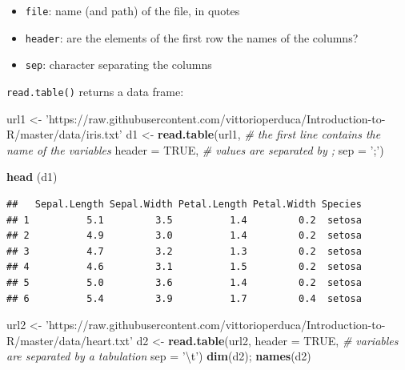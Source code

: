 \documentclass[]{book}
\newenvironment{Shaded}{\begin{snugshade}}{\end{snugshade}}
\newcommand{\CharTok}[1]{\textcolor[rgb]{0.31,0.60,0.02}{#1}}
\newcommand{\CommentTok}[1]{\textcolor[rgb]{0.56,0.35,0.01}{\textit{#1}}}
\newcommand{\DataTypeTok}[1]{\textcolor[rgb]{0.13,0.29,0.53}{#1}}
\newcommand{\KeywordTok}[1]{\textcolor[rgb]{0.13,0.29,0.53}{\textbf{#1}}}
\newcommand{\NormalTok}[1]{#1}
\newcommand{\OtherTok}[1]{\textcolor[rgb]{0.56,0.35,0.01}{#1}}
\newcommand{\StringTok}[1]{\textcolor[rgb]{0.31,0.60,0.02}{#1}}
\providecommand{\tightlist}{%
  \setlength{\itemsep}{0pt}\setlength{\parskip}{0pt}}
\begin{document}
\begin{itemize}
\tightlist
\item
  \texttt{file}: name (and path) of the file, in quotes
\item
  \texttt{header}: are the elements of the first row the names of the columns?
\item
  \texttt{sep}: character separating the columns
\end{itemize}

\texttt{read.table()} returns a data frame:

\begin{Shaded}
\begin{Highlighting}[]
\NormalTok{url1 <-}\StringTok{ 'https://raw.githubusercontent.com/vittorioperduca/Introduction-to-R/master/data/iris.txt'}
\NormalTok{d1 <-}\StringTok{ }\KeywordTok{read.table}\NormalTok{(url1,}
                 \CommentTok{# the first line contains the name of the variables}
                 \DataTypeTok{header =} \OtherTok{TRUE}\NormalTok{,}
                 \CommentTok{# values are separated by ;}
                 \DataTypeTok{sep =} \StringTok{';'}\NormalTok{) }

\KeywordTok{head}\NormalTok{ (d1)}
\end{Highlighting}
\end{Shaded}

\begin{verbatim}
##   Sepal.Length Sepal.Width Petal.Length Petal.Width Species
## 1          5.1         3.5          1.4         0.2  setosa
## 2          4.9         3.0          1.4         0.2  setosa
## 3          4.7         3.2          1.3         0.2  setosa
## 4          4.6         3.1          1.5         0.2  setosa
## 5          5.0         3.6          1.4         0.2  setosa
## 6          5.4         3.9          1.7         0.4  setosa
\end{verbatim}

\begin{Shaded}
\begin{Highlighting}[]
\NormalTok{url2 <-}\StringTok{ 'https://raw.githubusercontent.com/vittorioperduca/Introduction-to-R/master/data/heart.txt'}
\NormalTok{d2 <-}\StringTok{ }\KeywordTok{read.table}\NormalTok{(url2,}
                 \DataTypeTok{header =} \OtherTok{TRUE}\NormalTok{,}
                 \CommentTok{# variables are separated by a tabulation}
                 \DataTypeTok{sep =} \StringTok{'}\CharTok{\textbackslash{}t}\StringTok{'}\NormalTok{) }
\KeywordTok{dim}\NormalTok{(d2); }\KeywordTok{names}\NormalTok{(d2)}
\end{Highlighting}
\end{Shaded}
\end{document}
